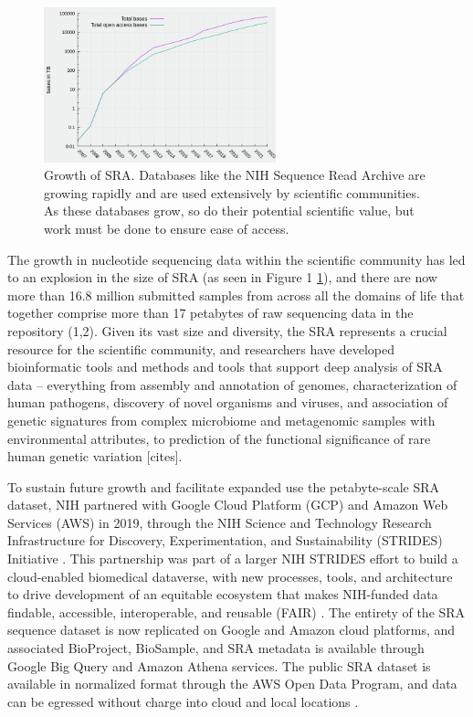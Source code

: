 \begin{figure}[t]
        \centering
        \includegraphics[width=0.6\textwidth]{images/sra_bases_TB.png}
        \caption{Growth of SRA. Databases like the NIH Sequence Read Archive are growing rapidly and are used extensively by scientific communities. As these databases grow, so do their potential scientific value, but work must be done to ensure ease of access.}
        \label{fig:sragrowth}
\end{figure}

The growth in nucleotide sequencing data within the scientific community has led to an explosion in the size of SRA (as seen in Figure 1 \ref{fig:sragrowth}), 
and there are now more than 16.8 million submitted samples from across all the domains of life that together comprise more than 17 petabytes of raw sequencing data in the repository (1,2). Given its vast size and diversity, the SRA represents a crucial resource for the scientific community, and researchers have developed bioinformatic tools and methods and tools that support deep analysis of SRA data – everything from assembly and annotation of genomes, characterization of human pathogens, discovery of novel organisms and viruses, and association of genetic signatures from complex microbiome and metagenomic samples with environmental attributes, to prediction of the functional significance of rare human genetic variation [cites].

To sustain future growth and facilitate expanded use the petabyte-scale SRA dataset, NIH partnered with Google Cloud Platform (GCP) \cite{GCP} and Amazon Web Services (AWS) \cite{AWS} in 2019, through the NIH Science and Technology Research Infrastructure for Discovery, Experimentation, and Sustainability (STRIDES) Initiative \cite{stridesini}. This partnership was part of a larger NIH STRIDES effort to build a cloud-enabled biomedical dataverse, with new processes, tools, and architecture to drive development of an equitable ecosystem that makes NIH-funded data findable, accessible, interoperable, and reusable (FAIR) \cite{wilkinson2016fair}. The entirety of the SRA sequence dataset is now replicated on Google and Amazon cloud platforms, and associated BioProject, BioSample, and SRA metadata is available through Google Big Query and Amazon Athena services. The public SRA dataset is available in normalized format through the AWS Open Data Program, and data can be egressed without charge into cloud and local locations \cite{sracosts}. 

